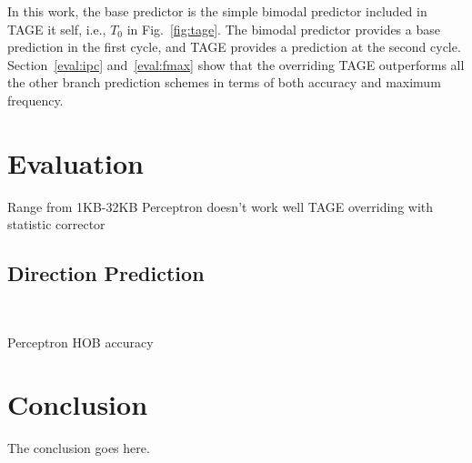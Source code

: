 \documentclass[conference]{IEEEtran}
\begin{document}
In this work, the base predictor is the simple bimodal predictor included in TAGE it self, i.e., $T_0$ in Fig.~\ref{fig:tage}. The bimodal predictor provides a base prediction in the first cycle, and TAGE provides a prediction at the second cycle. Section~\ref{eval:ipc} and~\ref{eval:fmax} show that the overriding TAGE outperforms all the other branch prediction schemes in terms of both accuracy and maximum frequency.

\section{Evaluation}
\label{sec:eval}
Range from 1KB-32KB
Perceptron doesn't work well
TAGE overriding with statistic corrector

\subsection{Direction Prediction}
\

Perceptron HOB accuracy


\section{Conclusion}
The conclusion goes here.












\end{document}

